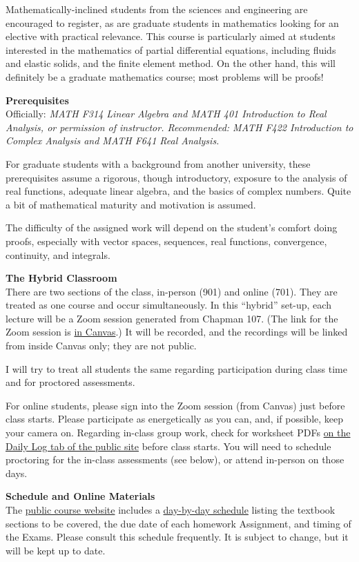 \documentclass[12pt]{article}
\renewcommand{\emph}[1]{\textsf{\textbf{#1}}}
\newcommand{\localhead}[1]{\par\smallskip\textbf{#1} \smallskip\nobreak\\}%
\def\heading#1{\localhead{\large\emph{#1}}}
\begin{document}
Mathematically-inclined students from the sciences and engineering are encouraged to register, as are graduate students in mathematics looking for an elective with practical relevance.  This course is particularly aimed at students interested in the mathematics of partial differential equations, including fluids and elastic solids, and the finite element method.  On the other hand, this will definitely be a graduate mathematics course; most problems will be proofs!


\clearpage\newpage
\phantom{foo}
\vskip -20pt

\heading{Prerequisites}
Officially: \textsl{MATH F314 Linear Algebra and MATH 401 Introduction to Real Analysis, or permission of instructor. Recommended: MATH F422 Introduction to Complex Analysis and MATH F641 Real Analysis.}

For graduate students with a background from another university, these prerequisites assume a rigorous, though introductory, exposure to the analysis of real functions, adequate linear algebra, and the basics of complex numbers.  Quite a bit of mathematical maturity and motivation is assumed.

The difficulty of the assigned work will depend on the student's comfort doing proofs, especially with vector spaces, sequences, real functions, convergence, continuity, and integrals.


\heading{The Hybrid Classroom}
There are two sections of the class, in-person (901) and online (701).  They are treated as one course and occur simultaneously.  In this ``hybrid'' set-up, each lecture will be a Zoom session generated from Chapman 107.  (The link for the Zoom session is \href{https://canvas.alaska.edu/courses/30068}{in Canvas}.)  It will be recorded, and the recordings will be linked from inside Canvas only; they are not public.

I will try to treat all students the same regarding participation during class time and for proctored assessments.

For online students, please sign into the Zoom session (from Canvas) just before class starts.  Please participate as energetically as you can, and, if possible, keep your camera on.  Regarding in-class group work, check for worksheet PDFs \href{https://bueler.github.io/fa/}{on the Daily Log tab of the public site} before class starts.  You will need to schedule proctoring for the in-class assessments (see below), or attend in-person on those days.


\heading{Schedule and Online Materials}
The \href{https://bueler.github.io/fa/}{public course website} includes a \href{https://bueler.github.io/fa/assets/general/S26/schedule.pdf}{day-by-day schedule} listing the textbook sections to be covered, the due date of each homework Assignment, and timing of the Exams.  Please consult this schedule frequently.  It is subject to change, but it will be kept up to date.
\end{document}
